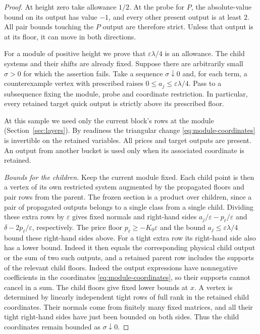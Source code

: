 \begin{proof}
At height zero take allowance $1/2$. At the probe for $P$, the
absolute-value bound on its output has value $-1$, and every other
present output is at least $2$. All pair bounds touching the $P$
output are therefore strict. Unless that output is at its floor, it
can move in both directions.

For a module of positive height we prove that \(\varepsilon\lambda/4\)
is an allowance. The child systems and their shifts are already fixed.
Suppose there are arbitrarily small \(\sigma>0\) for which the
assertion fails. Take a sequence \(\sigma\downarrow0\) and, for each
term, a counterexample vertex with prescribed raises
\(0\le a_j\le\varepsilon\lambda/4\). Pass to a subsequence fixing the
module, probe and coordinate restriction. In particular, every
retained target quick output is strictly above its prescribed floor.

At this sample we need only the current block's rows at the module
(Section~\ref{sec:layers}). By readiness the triangular change
\eqref{eq:module-coordinates} is invertible on the retained variables.
All prices and target outputs are present. An output from another
bucket is used only when its associated coordinate is retained.

\smallskip
\noindent\emph{Bounds for the children.}
Keep the current module fixed. Each child point is then a vertex of its
own restricted system augmented by the propagated floors and pair rows
from the parent. The frozen section is a product
over children, since a pair of propagated outputs belongs to a single
class from a single child. Dividing these extra rows by $\varepsilon$
gives fixed normals and right-hand sides $a_j/\varepsilon-p_\ell/\varepsilon$
and $\delta-2p_\ell/\varepsilon$, respectively. The price floor
$p_\ell\ge-K_0\varepsilon$ and the bound $a_j\le\varepsilon\lambda/4$
bound these right-hand sides above. For a tight extra row its right-hand
side also has a lower bound. Indeed it then equals the corresponding
physical child output or the sum of two such outputs, and a retained
parent row includes the supports of the relevant child floors. Indeed
the output expressions have nonnegative coefficients in the coordinates
\eqref{eq:module-coordinates}, so their supports cannot cancel in a sum.
The child floors give fixed lower bounds at \(x\). A vertex is determined by
linearly independent tight rows of full rank in the retained child
coordinates. Their normals come from finitely many fixed matrices, and
all their tight right-hand sides have just been bounded on both sides.
Thus the child coordinates remain bounded as \(\sigma\downarrow0\).


\end{proof}
